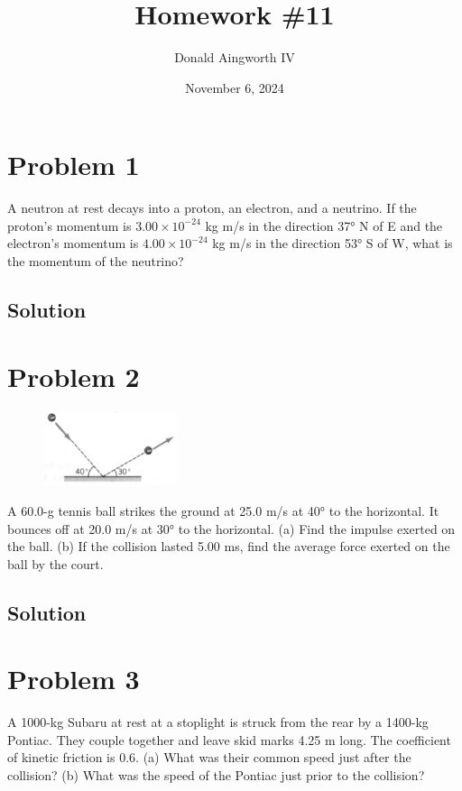 \documentclass[12pt]{article}
\title{Homework \#11}
\author{Donald Aingworth IV}
\date{November 6, 2024}
\begin{document}

\maketitle

\pagebreak
\section*{Problem 1}
A neutron at rest decays into a proton, an electron, and a neutrino. If the proton's momentum is $3.00\times10^{-24}$ kg m/s in the direction 37\unit{\degree} N of E and the electron's momentum is $4.00\times10^{-24}$ kg m/s in the direction 53\unit{\degree} S of W, what is the momentum of the neutrino?

\subsection*{Solution}


\pagebreak
\section*{Problem 2}
\begin{figure}
    \vspace{-30pt}
    \includegraphics[width=0.35\textwidth]{graph_2.png} 
\end{figure}
A 60.0-g tennis ball strikes the ground at 25.0 m/s at 40\unit{\degree} to the horizontal. It bounces off at 20.0 m/s at 30\unit{\degree} to the horizontal. (a) Find the impulse exerted on the ball. (b) If the collision lasted 5.00 ms, find the average force exerted on the ball by the court.

\subsection*{Solution}


\pagebreak
\section*{Problem 3}
A 1000-kg Subaru at rest at a stoplight is struck from the rear by a 1400-kg Pontiac. They couple together and leave skid marks 4.25 m long. The coefficient of kinetic friction is 0.6. (a) What was their common speed just after the collision? (b) What was the speed of the Pontiac just prior to the collision?
\end{document}
